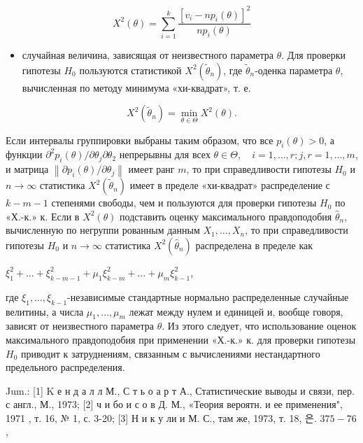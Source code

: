 \documentclass[10pt]{article}
\begin{document}
\[

X^{2}(\theta)=\sum_{i=1}^{k} \frac{\left[v_{i}-n p_{i}(\theta)\right]^{2}}{n p_{i}(\theta)}

\]



\begin{itemize}

  \item случайная величина, зависящая от неизвестного параметра $\theta$. Для проверки гипотезы $H_{0}$ пользуются статистикой $X^{2}\left(\tilde{\theta}_{n}\right)$, где $\tilde{\theta}_{n}$-оденка параметра $\theta$, вычисленная по методу минимума «хи-квадрат», т. е.

\end{itemize}



\[

X^{2}\left(\tilde{\theta}_{n}\right)=\min _{\theta \in \Theta} X^{2}(\theta) .

\]



Если интервалы группировки выбраны таким образом, что все $p_{i}(\theta)>0$, а функции $\partial^{2} p_{i}(\theta) / \partial \theta_{j} \partial \theta_{2}$ непрерывны для всех $\theta \in \Theta, \quad i=1, \ldots, r ; j, r=1, \ldots, m$, и матрица $\left\|\partial p_{i}(\theta) / \partial \theta_{j}\right\|$ имеет ранг $m$, то при справедливости гипотезы $H_{0}$ и $n \longrightarrow \infty$ статистика $X^{2}\left(\tilde{\theta}_{n}\right)$ имеет в пределе «хи-квадрат» распределение с $k-m-1$ степенями свободы, чем и пользуются для проверки гипотезы $H_{0}$ по «Х.-к.» к. Если в $X^{2}(\theta)$ подставить оценку максимального правдоподобия $\hat{\theta}_{n}$, вычисленную по негруппи рованным данным $X_{1}, \ldots, X_{n}$, то при справедливости гипотезы $H_{0}$ и $n \longrightarrow \infty$ статистика $X^{2}\left(\hat{\theta}_{n}\right)$ распределена в пределе как



$\xi_{1}^{2}+\ldots+\xi_{k-m-1}^{2}+\mu_{1} \xi_{k-m}^{2}+\ldots+\mu_{m} \xi_{k-1}^{2}$,



где $\xi_{1}, \ldots, \xi_{k-1}$-независимые стандартные нормально распределенные случайные велитины, а числа $\mu_{1}, \ldots, \mu_{m}$ лежат между нулем и единицей и, вообще говоря, зависят от неизвестного параметра $\theta$. Из этого следует, что использование оценок максимального правдоподобия при применении «Х.-к.» к. для проверки гипотезы $H_{0}$ приводит к затруднениям, связанным с вычислениями нестандартного предельного распределения.



Jum.: [1] K е н д а л л М., С т ь о а р т А., Статистические выводы и связи, пер. с англ., М., 1973; [2] ч и бо и с о в Д. М., «Теория вероятн. и ее применения", 1971 , т. 16, № 1, с. 3-20; [3] Н и к у ли и М. С., там же, 1973, т. 18, 은. $375-76$,
\end{document}
